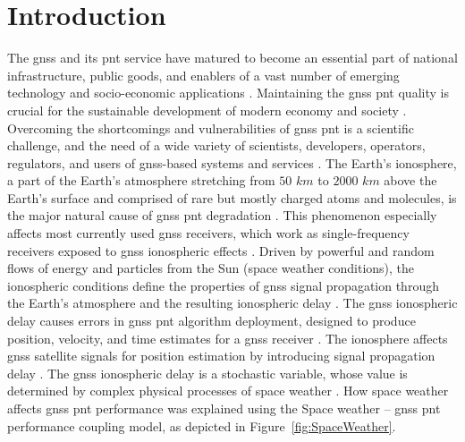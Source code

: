 \let\LaTeXcline\cline\documentclass[sn-mathphys-num]{sn-jnl}\let\cline\LaTeXcline
\begin{document}



\maketitle

\section{Introduction}

The \acrfull{gnss} and its \acrfull{pnt} service have matured to become an essential part of national infrastructure, public goods, and enablers of a vast number of emerging technology and socio-economic applications \cite{spilker1996global}. Maintaining the \acrshort{gnss} \acrshort{pnt} quality is crucial for the sustainable development of modern economy and society \cite{schaer1999mapping}. Overcoming the shortcomings and vulnerabilities of \acrshort{gnss} \acrshort{pnt} is a scientific challenge, and the need of a wide variety of scientists, developers, operators, regulators, and users of \acrshort{gnss}-based systems and services \cite{durmaz2015regional, jin2012m_dcb}. The Earth’s ionosphere, a part of the Earth’s atmosphere stretching from $50$ $km$ to $2000$ $km$ above the Earth’s surface and comprised of rare but mostly charged atoms and molecules, is the major natural cause of \acrshort{gnss} \acrshort{pnt} degradation \cite{davies1990ionospheric, liu2009seismoionospheric}. This phenomenon especially affects most currently used \acrshort{gnss} receivers, which work as single-frequency receivers exposed to \acrshort{gnss} ionospheric effects \cite{spilker1996global, prolss2012physics}. Driven by powerful and random flows of energy and particles from the Sun (space weather conditions), the ionospheric conditions define the properties of \acrshort{gnss} signal propagation through the Earth’s atmosphere and the resulting ionospheric delay \cite{davies1990ionospheric, oxley2017uncertainties, prolss2012physics}. The \acrshort{gnss} ionospheric delay causes errors in \acrshort{gnss} \acrshort{pnt} algorithm deployment, designed to produce position, velocity, and time estimates for a \acrshort{gnss} receiver \cite{spilker1996global, schaer1999mapping}. The ionosphere affects \acrshort{gnss} satellite signals for position estimation by introducing signal propagation delay \cite{spilker1996global, schaer1999mapping}. The \acrshort{gnss} ionospheric delay is a stochastic variable, whose value is determined by complex physical processes of space weather \cite{spilker1996global, schaer1999mapping}. How space weather affects \acrshort{gnss} \acrshort{pnt} performance was explained using the Space weather – \acrshort{gnss} \acrshort{pnt} performance coupling model, as depicted in Figure~\ref{fig:SpaceWeather}.
\end{document}
